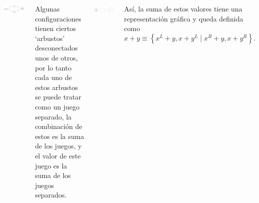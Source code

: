 \documentclass[20pt,margin=2.2cm,innermargin=-4.5in,blockverticalspace=-0.25in]{tikzposter}
\begin{document}
\begin{columns}
{        \begin{minipage}[t]{\linewidth}
            \centering
            \includegraphics[width=.7\textwidth]{images/hackenbush-surr_roots.pdf}
        \end{minipage}

        Algunas configuraciones tienen ciertos `arbustos' desconectados unos de otros, por lo tanto cada uno de estos arbustos se puede tratar como un juego separado, la combinaci\'on de estos es la suma de los juegos, y el valor de este juego es la suma de los juegos separados.
        \vspace{7mm}

        \begin{minipage}[t]{\linewidth}
            \centering
            \includegraphics[width=.7\textwidth]{images/hackenbush-sum_example.pdf}
        \end{minipage}

        \vspace{5mm}
        As\'i, la suma de estos valores tiene una representaci\'on gr\'afica y queda definida como 
        \[
            x + y  \equiv \left\{x^L+y, x+y^L\;|\;x^R+y, x+y^R\right\}.
        \]
    }

\end{columns}
\end{document}

